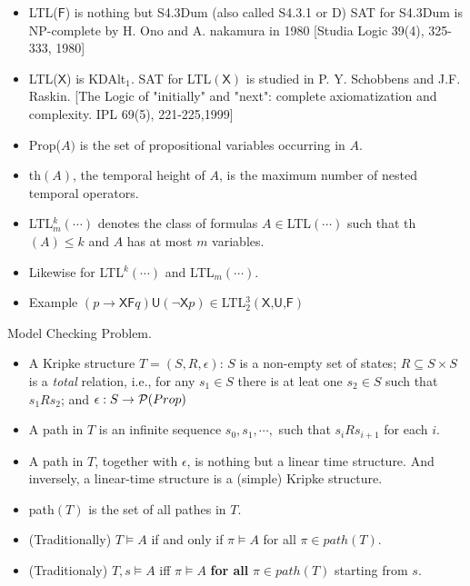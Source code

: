 \documentclass[12pt]{article}
\begin{document}
\begin{CJK*}{GBK}{song}
\begin{itemize}
\item LTL($\textsf{F}$) is nothing but S4.3Dum (also called S4.3.1 or D)
SAT for S4.3Dum is NP-complete by H. Ono and A. nakamura in 1980 [Studia Logic 39(4), 325-333, 1980]

\item LTL($\textsf{X}$) is KDAlt$_1$. SAT for LTL$(\textsf{X})$ is studied in  P. Y. Schobbens and J.F. Raskin. [The Logic of "initially" and "next": complete axiomatization and complexity. IPL 69(5), 221-225,1999]
\end{itemize}

\begin{itemize}
\item Prop($A)$ is the set of propositional variables occurring in $A$.

\item th$(A)$, the temporal height of $A$, is the maximum number of nested temporal operators.

\item LTL$^k_m(\cdots)$ denotes the class of  formulas $A\in$LTL$(\cdots)$ such that th$(A)\leq k$ and $A$ has at most $m$ variables.
\item Likewise for LTL$^k(\cdots)$ and LTL$_m(\cdots)$.
\item Example $(p\rightarrow \textsf{XF}q)\textsf{U}(\neg\textsf{X}p)\in$LTL$_2^3(\textsf{X,U,F})$
\end{itemize}


Model Checking Problem.

\begin{itemize}
\item A Kripke structure $T=(S, R,\epsilon)$: $S$ is a non-empty set of states; $R\subseteq S\times S$ is a {\em total} relation, i.e., for any $s_1\in S$ there is at leat one $s_2\in S$ such that $s_1Rs_2$; and $\epsilon: S\rightarrow {\cal P}(Prop)$
\item A path in $T$ is an infinite sequence $s_0, s_1,\cdots,$ such that $s_iRs_{i+1}$ for each $i$.

\item A path in $T$, together with $\epsilon$, is nothing but a linear time structure. And inversely, a linear-time structure is a (simple) Kripke structure.

\item path$(T)$ is the set of all pathes in $T$.

\item (Traditionally) $T\models A$ if and only if $\pi\models A$ for all $\pi\in path(T)$.
\item (Traditionaly) $T,s\models A$ iff $\pi\models A$ {\bf for all} $\pi\in path(T)$ starting from $s$.


\end{itemize}
\end{CJK*}
\end{document}
